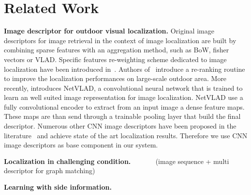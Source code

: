 \section{Related Work}
\label{sec:related_work}

\vspace{4pt}\noindent\textbf{Image descriptor for outdoor visual localization.} Original image descriptors for image retrieval in the context of image localization are built by combining sparse features with an aggregation method, such as BoW, fisher vectors or VLAD. Specific features re-weighting scheme dedicated to image localization have been introduced in~\cite{Arandjelovic2014}. Authors of~\cite{Sattler2016} introduce a re-ranking routine to improve the localization performances on large-scale outdoor area. More recently, \cite{Arandjelovic2017} introduces NetVLAD, a convolutional neural network that is trained to learn an well suited image representation for image localization. NetVLAD use a fully convolutional encoder to extract from an input image a dense feature maps. These maps are than send through a trainable pooling layer that build the final descriptor. Numerous other CNN image descriptors have been proposed in the literature~\cite{Kim2017a,Gordo2017,Radenovic2017,Sunderhauf2015a,Liu2018} and achieve state of the art localization results. Therefore we use CNN image descriptors as base component in our system.

\vspace{4pt}\noindent\textbf{Localization in challenging condition.} ~\cite{Sattler2018} ~\cite{Torii2015} ~\cite{Porav2018} ~\cite{Naseer2018} (image sequence + multi descriptor for graph matching) ~\cite{Schonberger2018} ~\cite{Garg2018} ~\cite{Naseer2017a}

\vspace{4pt}\noindent\textbf{Learning with side information.} 
